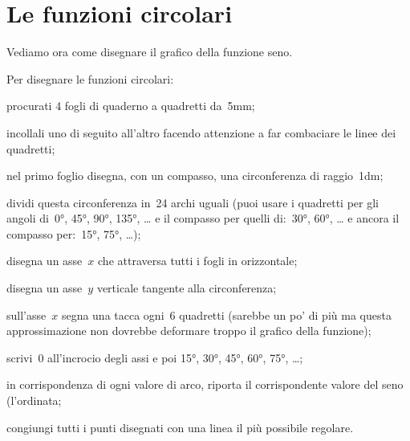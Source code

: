 \section{Le funzioni circolari}
\label{sec:gonio_funzionicircolari}
Vediamo ora come disegnare il grafico della funzione seno.

\begin{procedura}
 Per disegnare le funzioni circolari:
 \begin{enumeratea}
  \item procurati 4 fogli di quaderno a quadretti da~5mm;
  \item incollali uno di seguito all'altro 
   facendo attenzione a far combaciare le linee dei quadretti;
  \item nel primo foglio disegna, con un compasso, una circonferenza di
   raggio~1dm;
  \item dividi questa circonferenza in~24 archi uguali 
   (puoi usare i quadretti per gli angoli di~0°, 45°, 90°, 135°, \dots 
   e il compasso per quelli di:~30°, 60°, \dots
   e ancora il compasso per:~15°, 75°, \dots);
  \item disegna un asse~\(x\) che attraversa tutti i fogli in orizzontale;
  \item disegna un asse~\(y\) verticale tangente alla circonferenza;
  \item sull'asse~\(x\) segna una tacca ogni~6 quadretti 
   (sarebbe un po' di più ma questa approssimazione non dovrebbe deformare 
   troppo il grafico della funzione);
  \item scrivi~0 all'incrocio degli assi e poi 15°, 30°, 45°, 60°, 75°, \dots;
  \item in corrispondenza di ogni valore di arco, riporta il corrispondente
   valore del seno (l'ordinata;
  \item congiungi tutti i punti disegnati con una linea il più possibile 
   regolare.
 \end{enumeratea}
\end{procedura}
 \vspace{-6pt}
  \begin{center}
\begin{inaccessibleblock}
    
\end{inaccessibleblock}
  \end{center}

